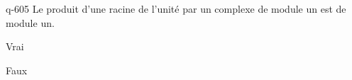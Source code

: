 \begin{truefalse}{q-605}
Le produit d'une racine de l'unité par un complexe de module un est de module un.
\item* Vrai
\item Faux
\end{truefalse}

